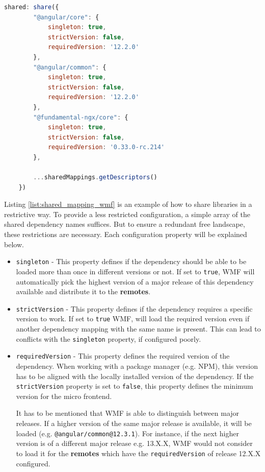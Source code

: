 \begin{lstlisting}[language=JavaScript, caption=Example of sharing dependencies configured in the \texttt{webpack.config.js}, label=list:shared_mapping_wmf,  xleftmargin=.01\textwidth, xrightmargin=.01\textwidth]
	shared: share({
		"@angular/core": { 
			singleton: true, 
			strictVersion: false, 
			requiredVersion: '12.2.0' 
		},
		"@angular/common": { 
			singleton: true, 
			strictVersion: false, 
			requiredVersion: '12.2.0' 
		},
		"@fundamental-ngx/core": { 
			singleton: true, 
			strictVersion: false, 
			requiredVersion: '0.33.0-rc.214' 
		},
		
		...sharedMappings.getDescriptors()
	})
\end{lstlisting}

Listing \ref{list:shared_mapping_wmf} is an example of how to share libraries in a restrictive way. To provide a less restricted configuration, a simple array of the shared dependency names suffices. But to ensure a redundant free landscape, these restrictions are necessary. Each configuration property will be explained below.

\begin{itemize}
	\item \texttt{singleton} - This property defines if the dependency should be able to be loaded more than once in different versions or not. If set to \texttt{true}, WMF will automatically pick the highest version of a major release of this dependency available and distribute it to the \textbf{remotes}.\cite{wmf_version_mismatch}
	
	\item \texttt{strictVersion} - This property defines if the dependency requires a specific version to work. If set to \texttt{true} WMF, will load the required version even if another dependency mapping with the same name is present. This can lead to conflicts with the \texttt{singleton} property, if configured poorly.
	
	\item \texttt{requiredVersion} - This property defines the required version of the dependency. When working with a package manager (e.g. NPM), this version has to be aligned with the locally installed version of the dependency. If the \texttt{strictVersion} property is set to \texttt{false}, this property defines the minimum version for the micro frontend. 
	
	It has to be mentioned that WMF is able to distinguish between major releases. If a higher version of the same major release is available, it will be loaded (e.g. \texttt{@angular/common@12.3.1}). For instance, if the next higher version is of a different major release e.g. 13.X.X, WMF would not consider to load it for the \textbf{remotes} which have the \texttt{requiredVersion} of release 12.X.X configured.
\end{itemize}

